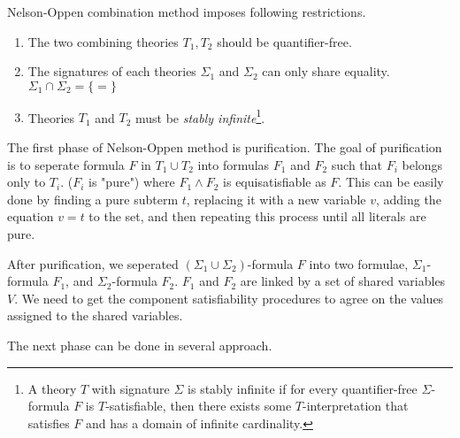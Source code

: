 \documentclass[10pt,a4paper]{article}
\begin{document}
	Nelson-Oppen combination method imposes following restrictions. 
	\begin{enumerate}[label=\roman*)]
		\item The two combining theories $ T_1, T_2 $ should be quantifier-free. 
		\item The signatures of each theories $ \Sigma_1 $ and $ \Sigma_2 $ can only share equality.	$ \Sigma_1 \cap \Sigma_2 = \{=\}$
		\item Theories $ T_1 $ and $ T_2 $ must be \textit{stably infinite}\footnote{A theory $ T $ with signature $ \Sigma $ is stably infinite if for every quantifier-free $ \Sigma $-formula $ F $ is $ T $-satisfiable, then there exists some $ T $-interpretation that satisfies $ F $ and has a domain of infinite cardinality.}.
	\end{enumerate}


	
	The first phase of Nelson-Oppen method is purification.	The goal of purification is to seperate formula $ F $ in $ T_1 \cup T_2 $ into formulas $ F_1 $ and $ F_2 $ such that $ F_i $ belongs only to $ T_i $. ($ F_i $ is "pure") where $ F_1 \wedge F_2 $ is equisatisfiable as $ F $. This can be easily done by finding a pure subterm $ t $, replacing it with a new variable $ v $, adding the equation $ v=t $ to the set, and then repeating this process until all literals are pure.
	
	After purification, we seperated $ (\Sigma_1 \cup \Sigma_2) $-formula $ F $ into two formulae, $ \Sigma_1 $-formula $ F_1 $, and $ \Sigma_2 $-formula $ F_2 $. $ F_1 $ and $ F_2 $ are linked by a set of shared variables $ V $. We need to get the component satisfiability procedures to agree on the values assigned to the shared variables. 
	
	The next phase can be done in several approach.
	
\end{document}
